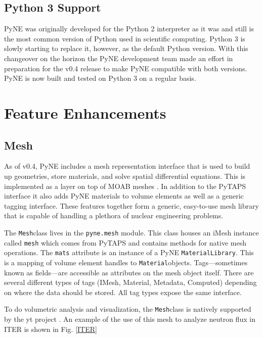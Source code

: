 \documentclass{anstrans}
\newcommand{\Mesh}{\texttt{Mesh}}
\newcommand{\Material}{\texttt{Material}}
\begin{document}
\subsection{Python 3 Support}

PyNE was originally developed for the Python 2 interpreter as it was 
and still is the most common version of Python used in scientific computing. 
Python 3 is slowly starting to replace it, however, as the default Python 
version. With this changeover on the horizon the PyNE development team 
made an effort in preparation for the v0.4 release to make PyNE compatible 
with both versions. PyNE is now built and tested on Python 3 on a regular basis.

\section{Feature Enhancements}

\subsection{Mesh}

As of v0.4, PyNE includes a mesh representation interface that is used to 
build up geometries, store materials, and solve spatial differential equations. %
This is implemented as a layer on top of MOAB meshes \cite{tautges_moab:_2004}.
In addition to the PyTAPS interface \cite{pytaps} it also adds PyNE materials to 
volume elements as well as a generic tagging interface. These features together 
form a generic, easy-to-use mesh library that is capable of handling a plethora
of nuclear engineering problems.

The \Mesh class lives in the \texttt{pyne.mesh} module. This class houses an 
iMesh instance called \texttt{mesh} which comes from PyTAPS and contains 
methods for native mesh operations. The \texttt{mats} attribute is an 
instance of a PyNE \texttt{MaterialLibrary}. This is a mapping of volume 
element handles to \Material objects. Tags---sometimes known as fields---are 
accessible as attributes on the mesh object itself. There are several different types
of tags (IMesh, Material, Metadata, Computed) depending on where the data should %
be stored. All tag types expose the same interface. 

To do volumetric analysis and visualization, the \Mesh class is natively supported 
by the yt project \cite{2011ApJS..192....9T}. An example of the use of this mesh
to analyze neutron flux in ITER is shown in Fig. \ref{ITER}
\end{document}
